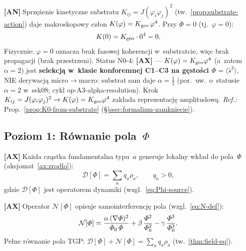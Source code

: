 \begin{chain}[A2b --- Warunek $K(0) = 0$ z~substratu (N0-4)]%
\label{chain:A2b}
  \textbf{[AN]}$\;$Sprz\k{e}\.zenie kinetyczne substratu
  $K_{ij} = J(\varphi_i\varphi_j)^2$ (tw.~\ref{prop:substrate-action})
  daje makroskopowy cz\l{}on $K(\varphi) = K_{\rm geo}\,\varphi^4$.
  Przy $\Phi = 0$ (tj.~$\varphi = 0$):
  \begin{equation}\label{eq:H-K0}
    K(0) = K_{\rm geo} \cdot 0^4 = 0.
  \end{equation}
  Fizycznie: $\varphi = 0$ oznacza brak fazowej koherencji w~substrat\-cie,
  wi\k{e}c brak propagacji (brak przestrzeni).
  Status N0-4: \textbf{[AX]} --- $K(\varphi)=K_{\rm geo}\varphi^4$ (a~zatem
  $\alpha=2$) jest \textbf{selekcj\k{a} w~klasie konforemnej C1--C3 na
  g\k{e}sto\'sci $\Phi=\langle\hat s^2\rangle$}, NIE derywacj\k{a} micro$\to$macro:
  substrat sam daje $\alpha=\tfrac12$ (por.\ uw.~o~statusie $\alpha=2$ w~sek08;
  cykl op-A3-alpha-resolution). Krok $K_{ij}=J(\varphi_i\varphi_j)^2 \to
  K(\varphi)=K_{\rm geo}\varphi^4$ zak\l{}ada reprezentacj\k{e} amplitudow\k{a}.
  \emph{Ref.:} Prop.~\ref{prop:K0-from-substrate} (\S\ref{ssec:formalizm-zamkniecie}).
\end{chain}

\subsection{Poziom 1: R\'ownanie pola~$\Phi$}%
\label{app:H-pole}

\begin{chain}\label{chain:A3}
  \textbf{[AX]}$\;$Ka\.zda cz\k{a}stka fundamentalna typu~$a$
  generuje lokalny wk\l{}ad do pola~$\Phi$ (aksjomat~\ref{ax:zrodlo}):
  \begin{equation}\label{eq:H-source}
    \mathcal{D}[\Phi] = \sum_a q_a \rho_a,
    \qquad
    q_a > 0,
  \end{equation}
  gdzie $\mathcal{D}[\Phi]$ jest operatorem dynamiki (wzgl.~\eqref{eq:Phi-source}).
\end{chain}

\begin{chain}\label{chain:A4}
  \textbf{[AX]}$\;$Operator $\mathcal{N}[\Phi]$ opisuje
  samointerferencj\k{e} pola (wzgl.~\eqref{eq:N-def}):
  \begin{equation}\label{eq:H-N}
    \mathcal{N}[\varPhi] =
      \frac{\alpha\,(\nabla\varPhi)^2}{\varPhi_0\,\varPhi}
      + \beta\,\frac{\varPhi^2}{\varPhi_0^2}
      - \gamma\,\frac{\varPhi^3}{\varPhi_0^3}.
  \end{equation}
  Pe\l{}ne r\'ownanie pola TGP: $\mathcal{D}[\Phi] + \mathcal{N}[\Phi]
  = \sum_a q_a \rho_a$ (tw.~\ref{thm:field-eq}).
\end{chain}

